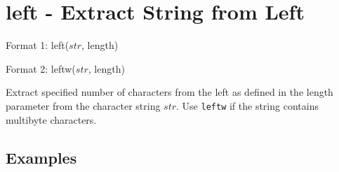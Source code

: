 
%

\section{left - Extract String from Left\label{sect:left}}

Format 1: left($str$, length)

Format 2: leftw($str$, length)

Extract specified number of characters from the left as defined in the length parameter from the character string $str$. Use \verb|leftw| if the string contains multibyte characters. 


\subsection*{Examples}


%

